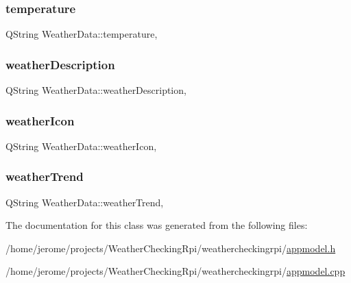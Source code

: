 \mbox{\label{class_weather_data_a2ee510e51cb81a6a479cd0af5f291e2c}} 
\subsubsection{\texorpdfstring{temperature}{temperature}}
{\footnotesize\ttfamily Q\+String Weather\+Data\+::temperature\hspace{0.3cm}{\ttfamily [read]}, {\ttfamily [write]}}

\mbox{\label{class_weather_data_a8b470bc177e317a6a6a6b51758724a1a}} 
\subsubsection{\texorpdfstring{weather\+Description}{weatherDescription}}
{\footnotesize\ttfamily Q\+String Weather\+Data\+::weather\+Description\hspace{0.3cm}{\ttfamily [read]}, {\ttfamily [write]}}

\mbox{\label{class_weather_data_aca04e1877e2d5bc6da0f1e9910553741}} 
\subsubsection{\texorpdfstring{weather\+Icon}{weatherIcon}}
{\footnotesize\ttfamily Q\+String Weather\+Data\+::weather\+Icon\hspace{0.3cm}{\ttfamily [read]}, {\ttfamily [write]}}

\mbox{\label{class_weather_data_a32541f768ce8d987063863610821580f}} 
\subsubsection{\texorpdfstring{weather\+Trend}{weatherTrend}}
{\footnotesize\ttfamily Q\+String Weather\+Data\+::weather\+Trend\hspace{0.3cm}{\ttfamily [read]}, {\ttfamily [write]}}



The documentation for this class was generated from the following files\+:\begin{DoxyCompactItemize}
\item 
/home/jerome/projects/\+Weather\+Checking\+Rpi/weathercheckingrpi/\hyperlink{appmodel_8h}{appmodel.\+h}\item 
/home/jerome/projects/\+Weather\+Checking\+Rpi/weathercheckingrpi/\hyperlink{appmodel_8cpp}{appmodel.\+cpp}\end{DoxyCompactItemize}
